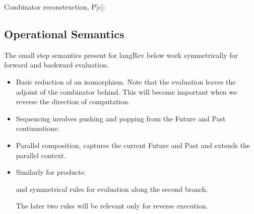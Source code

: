 \documentclass[preprint]{sigplanconf}
\begin{document}
Combinator reconstruction, {{P[c]}}:

\subsection{Operational Semantics}

The small step semantics present for {{langRev}} below work
symmetrically for forward and backward evaluation.

\begin{itemize}
\item 
Basic reduction of an isomorphism. Note that the evaluation leaves the
adjoint of the combinator behind. This will become important when we
reverse the direction of computation.


\item
Sequencing involves pushing and popping from the Future and Past
continuations:


\item
Parallel composition, captures the current Future and Past and extends
the parallel context.


\item
Similarly for products:


and symmetrical rules for evaluation along the second branch. 

The later two rules will be relevant only for reverse execution. 

\end{itemize}
\end{document}
